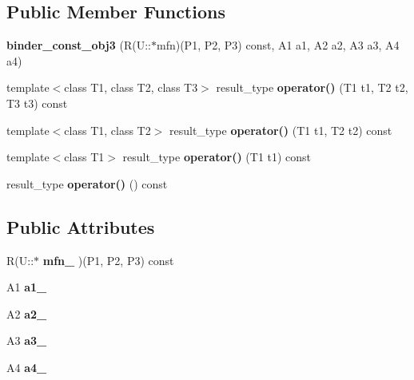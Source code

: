\subsection*{Public Member Functions}
\begin{CompactItemize}
\item 
\textbf{binder\_\-const\_\-obj3} (R(U::$\ast$mfn)(P1, P2, P3) const, A1 a1, A2 a2, A3 a3, A4 a4)\label{structam_1_1lambda_1_1binder__const__obj3_d1a2a9a00c547e964bf7bd12f8455144}

\item 
template$<$class T1, class T2, class T3$>$ result\_\-type \textbf{operator()} (T1 t1, T2 t2, T3 t3) const \label{structam_1_1lambda_1_1binder__const__obj3_a0aeefbadd1813edfff4d59f211ad7eb}

\item 
template$<$class T1, class T2$>$ result\_\-type \textbf{operator()} (T1 t1, T2 t2) const\label{structam_1_1lambda_1_1binder__const__obj3_7acb9c462d4a400221b7d84b12b6200a}

\item 
template$<$class T1$>$ result\_\-type \textbf{operator()} (T1 t1) const \label{structam_1_1lambda_1_1binder__const__obj3_0ae7249718a6fdbc02b94a5088ff24b3}

\item 
result\_\-type \textbf{operator()} () const\label{structam_1_1lambda_1_1binder__const__obj3_56d1b211608b9b090ea98eb947150b26}

\end{CompactItemize}
\subsection*{Public Attributes}
\begin{CompactItemize}
\item 
R(U::$\ast$ \textbf{mfn\_\-} )(P1, P2, P3) const\label{structam_1_1lambda_1_1binder__const__obj3_deed77c1939e2e503b28abac90abf125}

\item 
A1 \textbf{a1\_\-}\label{structam_1_1lambda_1_1binder__const__obj3_bfbb7829f21725bb9cf35a060fdc46ce}

\item 
A2 \textbf{a2\_\-}\label{structam_1_1lambda_1_1binder__const__obj3_784dcc6adf943e527b9b4417769482d4}

\item 
A3 \textbf{a3\_\-}\label{structam_1_1lambda_1_1binder__const__obj3_99fd86887d6960622ef335c5cfd9466c}

\item 
A4 \textbf{a4\_\-}\label{structam_1_1lambda_1_1binder__const__obj3_9f2fe1a3562aaa1c2059e56eb8a799c6}

\end{CompactItemize}


